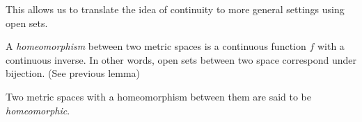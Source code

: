\documentclass[main.tex]{subfiles}
\begin{document}
		This allows us to translate the idea of continuity to more general settings using open sets.
		\begin{definition}
			A \textit{homeomorphism} between two metric spaces is a continuous function $f$ with a continuous inverse. In other words, open sets between two space correspond under bijection. (See previous lemma)
			
			Two metric spaces with a homeomorphism between them are said to be \textit{homeomorphic}.
		\end{definition}
\end{document}
